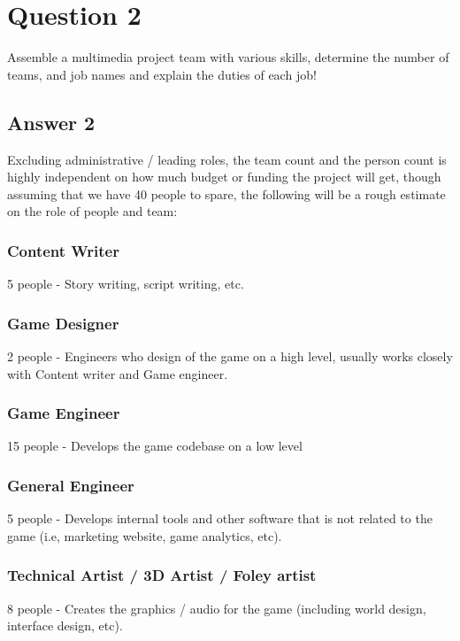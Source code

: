 \documentclass[
  11pt, %
]{assignment}
\begin{document}
\section*{Question 2}

\begin{problem}
Assemble a multimedia project team with various skills, determine the number of teams, and job names and explain the duties of each job!
\end{problem}

\subsection*{Answer 2}

Excluding administrative / leading roles, the team count and the person count is highly independent on how much budget or funding the project will get, though assuming that we have 40 people to spare, the following will be a rough estimate on the role of people and team:


\subsubsection*{Content Writer} 5 people - Story writing, script writing, etc.

\subsubsection*{Game Designer} 2 people - Engineers who design of the game on a high level, usually works closely with Content writer and Game engineer.

\subsubsection*{Game Engineer} 15 people - Develops the game codebase on a low level

\subsubsection*{General Engineer} 5 people - Develops internal tools and other software that is not related to the game (i.e, marketing website, game analytics, etc).

\subsubsection*{Technical Artist / 3D Artist / Foley artist} 8 people - Creates the graphics / audio for the game (including world design, interface design, etc).
\end{document}
